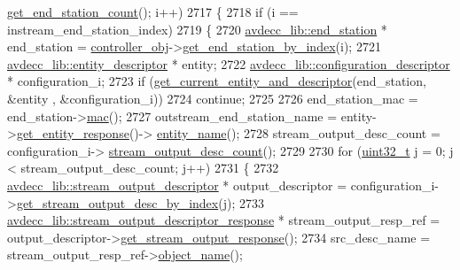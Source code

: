\begin{DoxyCode}
      \hyperlink{classavdecc__lib_1_1controller_ab5ddf7b4a9718fe3e821289141f44485}{get\_end\_station\_count}(); i++)
2717         \{
2718             \textcolor{keywordflow}{if} (i == instream\_end\_station\_index)
2719             \{
2720                 \hyperlink{classavdecc__lib_1_1end__station}{avdecc\_lib::end\_station} * end\_station = 
      \hyperlink{classcmd__line_af0a7784509e5bf1210a2aa19cea5df70}{controller\_obj}->\hyperlink{classavdecc__lib_1_1controller_a2a8ec1205ea0d5fdd6f833285257d0d0}{get\_end\_station\_by\_index}(i);
2721                 \hyperlink{classavdecc__lib_1_1entity__descriptor}{avdecc\_lib::entity\_descriptor} * entity;
2722                 \hyperlink{classavdecc__lib_1_1configuration__descriptor}{avdecc\_lib::configuration\_descriptor} * configuration\_i;
2723                 \textcolor{keywordflow}{if} (\hyperlink{classcmd__line_aa22ed7f036749918eb875043f10060c9}{get\_current\_entity\_and\_descriptor}(end\_station, &entity
      , &configuration\_i))
2724                     \textcolor{keywordflow}{continue};
2725 
2726                 end\_station\_mac = end\_station->\hyperlink{classavdecc__lib_1_1end__station_a74d2328723e6f5ab7a275e3b0d4cf2a0}{mac}();
2727                 outstream\_end\_station\_name = entity->\hyperlink{classavdecc__lib_1_1entity__descriptor_ac31dd117f0c931ae93c8ba52df7211bd}{get\_entity\_response}()->
      \hyperlink{classavdecc__lib_1_1entity__descriptor__response_a3abd11ceacbf37b685377f2b73a502ca}{entity\_name}();
2728                 stream\_output\_desc\_count = configuration\_i->
      \hyperlink{classavdecc__lib_1_1configuration__descriptor_a9ebee6c612e3cfec50f5168790bd265c}{stream\_output\_desc\_count}();
2729 
2730                 \textcolor{keywordflow}{for} (\hyperlink{parse_8c_a6eb1e68cc391dd753bc8ce896dbb8315}{uint32\_t} j = 0; j < stream\_output\_desc\_count; j++)
2731                 \{
2732                     \hyperlink{classavdecc__lib_1_1stream__output__descriptor}{avdecc\_lib::stream\_output\_descriptor} * 
      output\_descriptor = configuration\_i->\hyperlink{classavdecc__lib_1_1configuration__descriptor_a300ea5957342e2e9579318135da02856}{get\_stream\_output\_desc\_by\_index}(j);
2733                     \hyperlink{classavdecc__lib_1_1stream__output__descriptor__response}{avdecc\_lib::stream\_output\_descriptor\_response}
       * stream\_output\_resp\_ref = output\_descriptor->\hyperlink{classavdecc__lib_1_1stream__output__descriptor_af92b70610c451a7f1eefcb71b3d97eb8}{get\_stream\_output\_response}();
2734                     src\_desc\_name = stream\_output\_resp\_ref->\hyperlink{classavdecc__lib_1_1descriptor__response__base_a133f7774946d80f82b8aaaa4cfbb7361}{object\_name}();

\end{DoxyCode}
